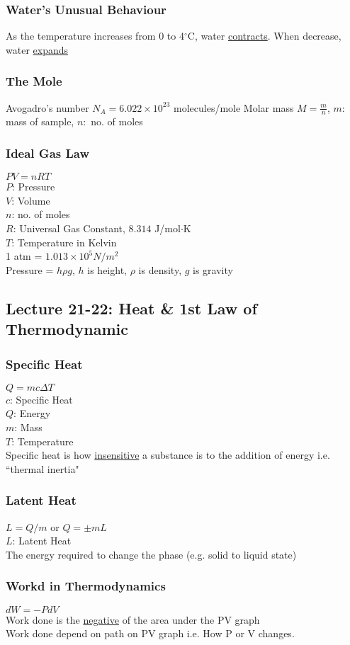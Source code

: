 \documentclass[10 pt]{article}
\begin{document}
\begin{multicols}{2}
\subsubsection*{Water's Unusual Behaviour}
\noindent As the temperature increases from 0 to 4$^\circ$C, water \underline{contracts}. When decrease, water \underline{expands}
\subsubsection*{The Mole}
Avogadro's number $N_A = 6.022 \times 10^{23}$ molecules/mole
\indent Molar mass $M = \frac{m}{n}$, $m: $ mass of sample, $n: $ no. of moles
\subsubsection*{Ideal Gas Law}
$PV = nRT$\\
$P$: Pressure \\
$V$: Volume \\
$n$: no. of moles \\
$R$: Universal Gas Constant, $8.314$ J/mol$\cdot$K \\
$T$: Temperature in Kelvin \\
1 atm = $1.013 \times 10^5 N/m^2$ \\
Pressure = $h \rho g$, $h$ is height, $\rho$ is density, $g$ is gravity
\subsection*{Lecture 21-22: Heat \& 1st Law of Thermodynamic}
\subsubsection*{Specific Heat}
$Q = mc\Delta T$ \\
$c$: Specific Heat \\
$Q$: Energy \\
$m$: Mass \\
$T$: Temperature \\
Specific heat is how \underline{insensitive} a substance is to the addition of energy i.e. ``thermal inertia"
\subsubsection*{Latent Heat}
$L = Q/m$ or $Q = \pm mL$ \\
$L$: Latent Heat\\
The energy required to change the phase (e.g. solid to liquid state)
\subsubsection*{Workd in Thermodynamics}
$dW = -P dV$ \\
Work done is the \underline{negative} of the area under the PV graph \\
Work done depend on path on PV graph i.e. How P or V changes.

\end{multicols}
\end{document}
